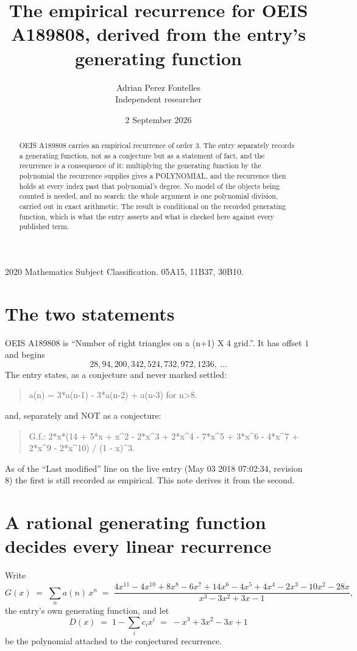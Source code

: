 \documentclass[11pt,a4paper]{article}
\title{The empirical recurrence for OEIS A189808, derived from the entry's generating function}
\author{Adrian Perez Fontelles\\ \small Independent researcher}
\date{2 September 2026}
\theoremstyle{plain}
\theoremstyle{definition}
\begin{document}
\maketitle

\begin{abstract}
OEIS A189808 carries an empirical recurrence of order $3$. The entry separately records a
generating function, not as a conjecture but as a statement of fact, and the recurrence is a
consequence of it: multiplying the generating function by the polynomial the recurrence
supplies gives a POLYNOMIAL, and the recurrence then holds at every index past that
polynomial's degree. No model of the objects being counted is needed, and no search: the
whole argument is one polynomial division, carried out in exact arithmetic. The result is
conditional on the recorded generating function, which is what the entry asserts and what is
checked here against every published term.
\end{abstract}

\noindent\small 2020 Mathematics Subject Classification. 05A15, 11B37, 30B10.\normalsize

\section{The two statements}

OEIS A189808 is ``Number of right triangles on a (n+1) X 4 grid.''. It has offset $1$ and begins
\[
28, 94, 200, 342, 524, 732, 972, 1236,\ \dots
\]
The entry states, as a conjecture and never marked settled:
\begin{quote}
a(n) = 3*a(n-1) - 3*a(n-2) + a(n-3) for n>8.
\end{quote}
and, separately and NOT as a conjecture:
\begin{quote}
G.f.: 2*x*(14 + 5*x + x\^{}2 - 2*x\^{}3 + 2*x\^{}4 - 7*x\^{}5 + 3*x\^{}6 - 4*x\^{}7 + 2*x\^{}9 - 2*x\^{}10) / (1 - x)\^{}3.
\end{quote}
As of the ``Last modified'' line on the live entry (May 03 2018 07:02:34, revision 8) the first is still
recorded as empirical. This note derives it from the second.

\section{A rational generating function decides every linear recurrence}

Write
\[
G(x)\;=\;\sum_{n}a(n)\,x^{n}\;=\;\frac{4 x^{11} - 4 x^{10} + 8 x^{8} - 6 x^{7} + 14 x^{6} - 4 x^{5} + 4 x^{4} - 2 x^{3} - 10 x^{2} - 28 x}{x^{3} - 3 x^{2} + 3 x - 1},
\]
the entry's own generating function, and let
\[
D(x)\;=\;1-\sum_i c_i x^{i}\;=\;- x^{3} + 3 x^{2} - 3 x + 1
\]
be the polynomial attached to the conjectured recurrence.
\end{document}
